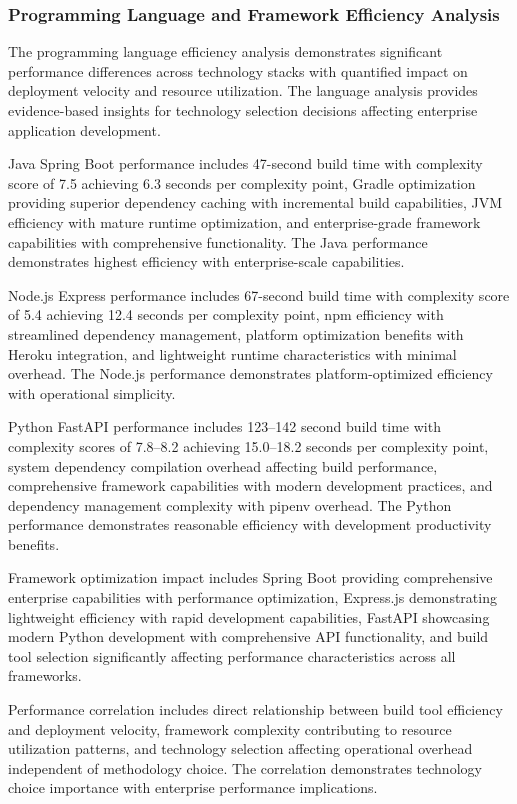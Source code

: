 \subsubsection{Programming Language and Framework Efficiency Analysis}

The programming language efficiency analysis demonstrates significant performance differences across technology stacks with quantified impact on deployment velocity and resource utilization. The language analysis provides evidence-based insights for technology selection decisions affecting enterprise application development.

Java Spring Boot performance includes 47-second build time with complexity score of 7.5 achieving 6.3 seconds per complexity point, Gradle optimization providing superior dependency caching with incremental build capabilities, JVM efficiency with mature runtime optimization, and enterprise-grade framework capabilities with comprehensive functionality. The Java performance demonstrates highest efficiency with enterprise-scale capabilities.

Node.js Express performance includes 67-second build time with complexity score of 5.4 achieving 12.4 seconds per complexity point, npm efficiency with streamlined dependency management, platform optimization benefits with Heroku integration, and lightweight runtime characteristics with minimal overhead. The Node.js performance demonstrates platform-optimized efficiency with operational simplicity.

Python FastAPI performance includes 123--142 second build time with complexity scores of 7.8--8.2 achieving 15.0--18.2 seconds per complexity point, system dependency compilation overhead affecting build performance, comprehensive framework capabilities with modern development practices, and dependency management complexity with pipenv overhead. The Python performance demonstrates reasonable efficiency with development productivity benefits.

Framework optimization impact includes Spring Boot providing comprehensive enterprise capabilities with performance optimization, Express.js demonstrating lightweight efficiency with rapid development capabilities, FastAPI showcasing modern Python development with comprehensive API functionality, and build tool selection significantly affecting performance characteristics across all frameworks.

Performance correlation includes direct relationship between build tool efficiency and deployment velocity, framework complexity contributing to resource utilization patterns, and technology selection affecting operational overhead independent of methodology choice. The correlation demonstrates technology choice importance with enterprise performance implications.

